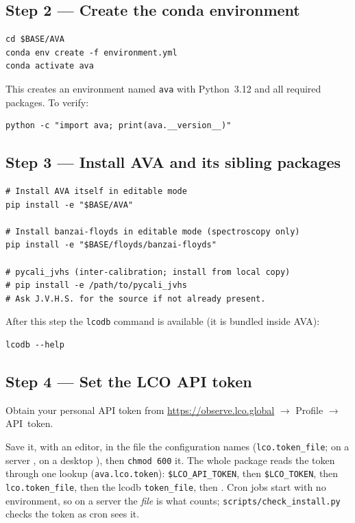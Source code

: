 \documentclass[12pt,a4paper]{article}
\begin{document}
\subsection{Step 2 --- Create the conda environment}

\begin{lstlisting}[style=shell]
cd $BASE/AVA
conda env create -f environment.yml
conda activate ava
\end{lstlisting}

This creates an environment named \texttt{ava} with Python~3.12 and all
required packages.  To verify:
\begin{lstlisting}[style=shell]
python -c "import ava; print(ava.__version__)"
\end{lstlisting}

\subsection{Step 3 --- Install AVA and its sibling packages}

\begin{lstlisting}[style=shell]
# Install AVA itself in editable mode
pip install -e "$BASE/AVA"

# Install banzai-floyds in editable mode (spectroscopy only)
pip install -e "$BASE/floyds/banzai-floyds"

# pycali_jvhs (inter-calibration; install from local copy)
# pip install -e /path/to/pycali_jvhs
# Ask J.V.H.S. for the source if not already present.
\end{lstlisting}

After this step the \texttt{lcodb} command is available (it is bundled inside
AVA):
\begin{lstlisting}[style=shell]
lcodb --help
\end{lstlisting}

\subsection{Step 4 --- Set the LCO API token}

Obtain your personal API token from
\url{https://observe.lco.global} $\to$ Profile $\to$ API~token.

Save it, with an editor, in the file the configuration names (\texttt{lco.token\_file}; on a server
, on a desktop ), then \texttt{chmod 600} it.
The whole package reads the token through one lookup (\texttt{ava.lco.token}): \texttt{\$LCO\_API\_TOKEN},
then \texttt{\$LCO\_TOKEN}, then \texttt{lco.token\_file}, then the lcodb \texttt{token\_file}, then
.  Cron jobs start with no environment, so on a server the \emph{file} is what counts;
\texttt{scripts/check\_install.py} checks the token as cron sees it.
\end{document}
